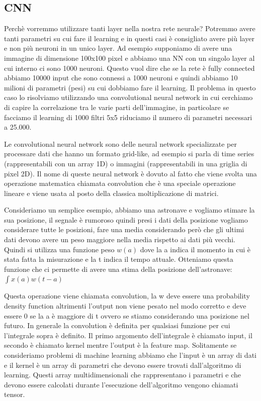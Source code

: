 \documentclass[14pt]{extreport}
\begin{document}
\subsection{CNN}

Perchè vorremmo utilizzare tanti layer nella nostra rete neurale? Potremmo avere tanti parametri su cui fare il learning e in questi casi è
consigliato avere più layer e non più neuroni in un unico layer. Ad esempio supponiamo di avere una immagine di dimensione 100x100 pixel e abbiamo una
NN con un singolo layer al cui interno ci sono 1000 neuroni. Questo vuol dire che se la rete è fully connected abbiamo 10000 input che sono connessi a
1000 neuroni e quindi abbiamo 10 milioni di parametri (pesi) su cui dobbiamo fare il learning. Il problema in questo caso lo risolviamo utilizzando
una convolutional neural network in cui cerchiamo di capire la correlazione tra le varie parti dell'immagine, in particolare se facciamo il learning
di 1000 filtri 5x5 riduciamo il numero di parametri necessari a 25.000.

Le convolutional neural network sono delle neural network specializzate per processare dati che hanno un formato grid-like, ad esempio si parla di 
time series (rappresentabili con un array 1D) o immagini (rappresentabili in una griglia di pixel 2D).
Il nome di queste neural network è dovuto al fatto che viene svolta una operazione matematica chiamata convolution
che è una speciale operazione lineare e viene usata al posto della classica moltiplicazione di matrici.

Consideriamo un semplice esempio, abbiamo una astronave e vogliamo stimare la sua posizione, il segnale è rumoroso
quindi presi i dati della posizione vogliamo considerare tutte le posizioni, fare una media considerando però che gli ultimi
dati devono avere un peso maggiore nella media rispetto ai dati più vecchi.
Quindi si utilizza una funzione peso $w(a)$ dove la a indica il momento in cui è stata fatta la misurazione e la t 
indica il tempo attuale.
Otteniamo questa funzione che ci permette di avere una stima della posizione dell'astronave:
$\int x(a)w(t-a)$

Questa operazione viene chiamata convolution, la w deve essere una probability density function altrimenti l'output non
viene pesato nel modo corretto e deve essere 0 se la a è maggiore di t ovvero se stiamo considerando una posizione nel futuro.
In generale la convolution è definita per qualsiasi funzione per cui l'integrale sopra è definito.
Il primo argomento dell'integrale è chiamato input, il secondo è chiamato kernel mentre l'output è la feature map.
Solitamente se consideriamo problemi di machine learning abbiamo che l'input è un array di dati e il kernel è un array di parametri 
che devono essere trovati dall'algoritmo di learning. Questi array multidimensionali che rappresentano i parametri e che devono essere calcolati
durante l'esecuzione dell'algoritmo vengono chiamati tensor.
\end{document}
